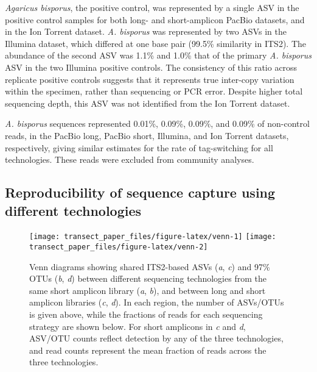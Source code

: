 \documentclass[
  12pt,
]{article}
\begin{document}
\emph{Agaricus bisporus}, the positive control, was represented by a single ASV in the positive control samples for both long- and short-amplicon PacBio datasets, and in the Ion Torrent dataset.
\emph{A. bisporus} was represented by two ASVs in the Illumina dataset, which differed at one base pair (99.5\% similarity in ITS2).
The abundance of the second ASV was 1.1\% and 1.0\% that of the primary \emph{A. bisporus} ASV in the two Illumina positive controls.
The consistency of this ratio across replicate positive controls suggests that it represents true inter-copy variation within the specimen, rather than sequencing or PCR error.
Despite higher total sequencing depth, this ASV was not identified from the Ion Torrent dataset.

\emph{A. bisporus} sequences represented 0.01\%, 0.09\%, 0.09\%, and 0.09\% of non-control reads, in the PacBio long, PacBio short, Illumina, and Ion Torrent datasets, respectively, giving similar estimates for the rate of tag-switching for all technologies.
These reads were excluded from community analyses.

\hypertarget{reproducibility-of-sequence-capture-using-different-technologies}{%
\subsection{Reproducibility of sequence capture using different technologies}\label{reproducibility-of-sequence-capture-using-different-technologies}}







\begin{figure}

{\centering \texttt{[image: transect\_paper\_files/figure-latex/venn-1]} \texttt{[image: transect\_paper\_files/figure-latex/venn-2]} 

}

\caption[Venn diagrams of shared ASVs and OTUs between different sequencing technologies]{Venn diagrams showing shared ITS2-based ASVs (\emph{a}, \emph{c}) and 97\% OTUs (\emph{b}, \emph{d}) between different sequencing technologies from the same short amplicon library (\emph{a}, \emph{b}), and between long and short amplicon libraries (\emph{c}, \emph{d}).
In each region, the number of ASVs/OTUs is given above, while the fractions of reads for each sequencing strategy are shown below.
For short amplicons in \emph{c} and \emph{d}, ASV/OTU counts reflect detection by any of the three technologies, and read counts represent the mean fraction of reads across the three technologies.}\label{fig:venn}
\end{figure}
\end{document}
